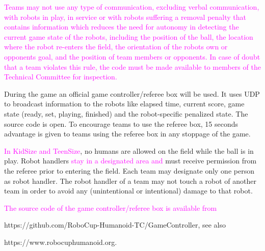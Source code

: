 \textcolor{magenta}{Teams may not use any type of communication, excluding verbal communication, with robots in play, in service or with robots suffering a removal penalty that contains information which reduces the need for autonomy in detecting the current game state of the robots, including the position of the ball, the location where the robot re-enters the field, the orientation of the robots own or opponents goal, and the position of team members or opponents. In case of doubt that a team violates this rule, the code must be made available to members of the Technical Committee for inspection.}

\bigskip

During the game an official game controller/referee box will be used. It uses UDP to broadcast information to the robots like elapsed time, current score, game state (ready, set, playing, finished) and the robot-specific penalized state. The source code is open. To encourage teams to use the referee box, 15 seconds advantage is given to teams using the referee box in any stoppage of the game.



\bigskip

\textcolor{magenta}{In KidSize and TeenSize}, no humans are allowed on the field while the ball is in play. Robot handlers \textcolor{magenta}{stay in a designated area and} must receive permission from the referee prior to entering the field. Each team may designate only one person as robot handler. The robot handler of a team may not touch a robot of another team in order to avoid any (unintentional or intentional) damage to that robot. 

\bigskip

\textcolor{magenta}{The source code of the game controller/referee box is available from}

\textcolor[rgb]{0.0,0.0,0.49803922}{https://github.com/RoboCup-Humanoid-TC/GameController},
see also 

\textcolor[rgb]{0.0,0.0,0.49803922}{https://www.robocuphumanoid.org}.

